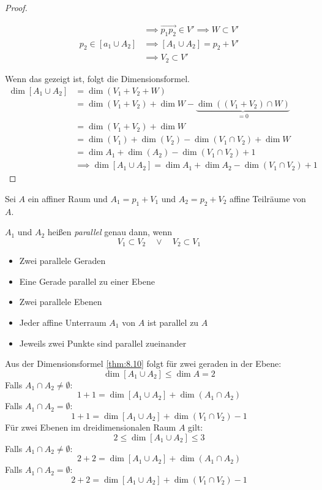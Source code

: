 \documentclass{mycourse}
\begin{document}
\begin{thm}
\begin{proof}
\begin{enumerate}
\begin{align*}
&\implies \vec{p_1p_2}\in V'\implies W\subset V'\\
p_2\in[a_1\cup A_2]&\implies [A_1\cup A_2]=p_2+V'\\ &\implies V_2\subset V'
\end{align*}
\end{enumerate}
Wenn das gezeigt ist, folgt die Dimensionsformel.
\begin{align*}
\dim[A_1\cup A_2]&=\dim (V_1+V_2+W)\\
&=\dim(V_1+V_2)+\dim W -\underbrace{\dim((V_1+V_2)\cap W)}_{=0}\\
&=\dim(V_1+V_2)+\dim W \\
&=\dim(V_1) +\dim(V_2)-\dim(V_1\cap V_2)+\dim W\\
&=\dim{A_1}+\dim(A_2)-\dim(V_1\cap V_2) +1\\
&\implies \dim[A_1\cup A_2]=\dim A_1+\dim A_2-\dim(V_1\cap V_2)+1
\end{align*}
\end{proof}
\end{thm}

\begin{df} \label{df:8.11}
Sei $A$ ein affiner Raum und $A_1=p_1+V_1$ und $A_2=p_2+V_2$ affine Teilräume von $A$.

$A_1$ und $A_2$ heißen \emph{parallel} genau dann, wenn 
\[
	V_1\subset V_2 \quad \lor \quad V_2 \subset V_1
\]
\begin{ex}
\begin{itemize}
\item Zwei parallele Geraden
\item Eine Gerade parallel zu einer Ebene
\item Zwei parallele Ebenen
\item Jeder affine Unterraum $A_1$ von $A$ ist parallel zu $A$
\item Jeweils zwei Punkte sind parallel zueinander
\end{itemize}
\end{ex}
\end{df}

Aus der Dimensionsformel \ref{thm:8.10} folgt für zwei geraden in der Ebene:
\[ \dim[A_1\cup A_2]\le \dim A = 2\]
Falls $A_1\cap A_2\neq \emptyset$:
\[ 1+1 = \dim[A_1\cup A_2]+\dim(A_1\cap A_2)\]
Falls $A_1\cap A_2=\emptyset$:
\[ 1+1=\dim[A_1\cup A_2]+\dim(V_1\cap V_2)-1\]
Für zwei Ebenen im dreidimensionalen Raum $A$ gilt:
\[  2\le\dim[A_1\cup A_2]\le3\]
Falls $A_1\cap A_2\neq\emptyset$:
\[ 2+2=\dim[A_1\cup A_2]+\dim(A_1\cap A_2)\]
Falls $A_1\cap A_2=\emptyset$:
\[ 2+2=\dim[A_1\cup A_2]+\dim(V_1\cap V_2)-1\]
\end{document}
